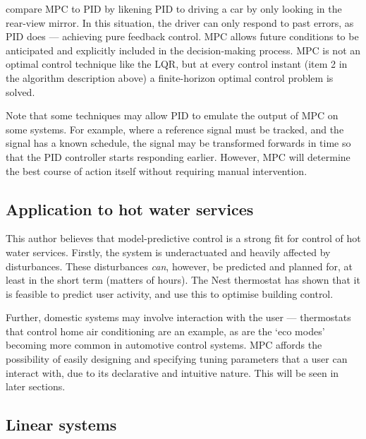  compare MPC to PID by likening PID to driving a car by only looking in the rear-view mirror.
In this situation, the driver can only respond to past errors, as PID does --- achieving pure feedback control.
MPC allows future conditions to be anticipated and explicitly included in the decision-making process.
MPC is not an optimal control technique like the LQR, but at every control instant (item 2 in the algorithm description above) a finite-horizon optimal control problem is solved.

Note that some techniques may allow PID to emulate the output of MPC on some systems.
For example, where a reference signal must be tracked, and the signal has a known schedule, the signal may be transformed forwards in time so that the PID controller starts responding earlier.
However, MPC will determine the best course of action itself without requiring manual intervention.

\subsection{Application to hot water services}

This author believes that model-predictive control is a strong fit for control of hot water services.
Firstly, the system is underactuated and heavily affected by disturbances.
These disturbances \emph{can}, however, be predicted and planned for, at least in the short term (matters of hours).
The Nest thermostat has shown that it is feasible to predict user activity, and use this to optimise building control.

Further, domestic systems may involve interaction with the user --- thermostats that control home air conditioning are an example, as are the `eco modes' becoming more common in automotive control systems.
MPC affords the possibility of easily designing and specifying tuning parameters that a user can interact with, due to its declarative and intuitive nature.
This will be seen in later sections.

\subsection{Linear systems}

